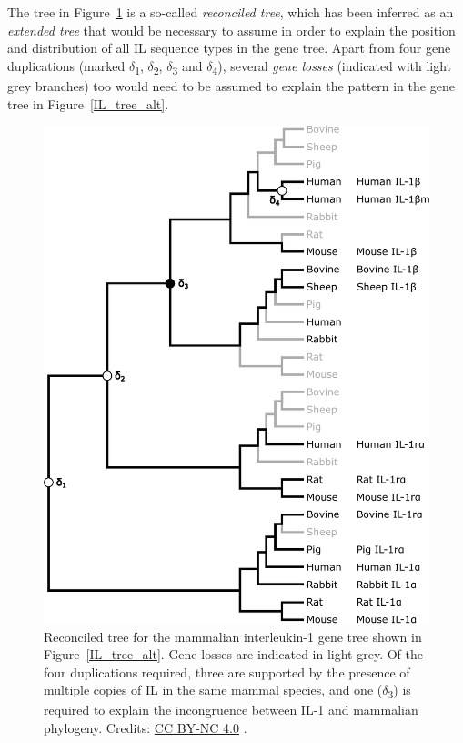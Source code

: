 The tree in Figure~\ref{IL_reconciled_alt} is a so-called \textit{reconciled tree}, which has been inferred as an \textit{extended tree} that would be necessary to assume in order to explain the position and distribution of all IL sequence types in the gene tree.
Apart from four gene duplications (marked $\delta$\textsubscript{1}, $\delta$\textsubscript{2}, $\delta$\textsubscript{3} and $\delta$\textsubscript{4}), several \textit{gene losses} (indicated with light grey branches) too would need to be assumed to explain the pattern in the gene tree in Figure~\ref{IL_tree_alt}.

% 

\begin{figure}[!htbp]
\centering
\includegraphics[width=0.6\linewidth]{files/IL-reconciled_alt-f4622dda751c1e5d8897ab8ec85ab066.pdf}
\caption[]{Reconciled tree for the mammalian interleukin-1 gene tree shown in Figure~\ref{IL_tree_alt}.
Gene losses are indicated in light grey.
Of the four duplications required, three are supported by the presence of multiple copies of IL in the same mammal species, and one ($\delta$\textsubscript{3}) is required to explain the incongruence between IL-1 and mammalian phylogeny.
Credits: \href{https://creativecommons.org/licenses/by-nc/4.0/}{CC BY-NC 4.0} \cite{own_3_2024}.}
\label{IL_reconciled_alt}
\end{figure}

